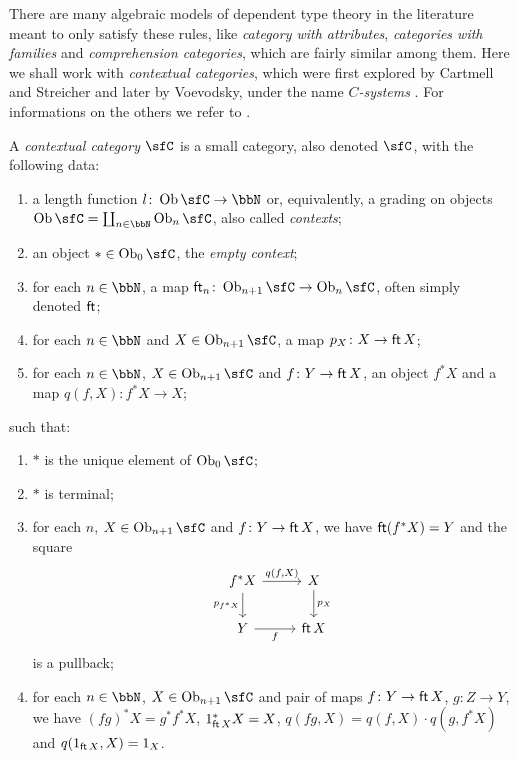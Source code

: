 \noindent
There are many algebraic models of dependent type theory in the literature meant
to only satisfy these rules, like
\emph{category with attributes}, \emph{categories with families} and
\emph{comprehension categories}, which are
fairly similar among them.
Here we shall work with \emph{contextual
categories}, which were first explored by Cartmell and Streicher
\cite{Car78,Car86,Str91} and later by Voevodsky, under the name
$C$\emph{-systems} \cite{Voe14a}. For informations on the
others we refer to \cite{nlab:categorical_model_of_dependent_types}.

\begin{defn}
  A \emph{contextual category} $\sfC$ is a small category, also denoted $\sfC$,
  with the following data:
  \begin{enumerate}
    \item a length function $l\colon\Ob\sfC\rightarrow\bbN$ or, equivalently, a
      grading on objects $\Ob\sfC=\coprod_{n\in\bbN}\Ob_n\sfC$, also called
      \emph{contexts};
    \item an object $*\in\Ob_0\sfC$, the \emph{empty context};
    \item for each $n\in\bbN$, a map
      $\cft_n\colon\Ob_{n+1}\sfC\rightarrow\Ob_n\sfC$, often simply denoted
      $\operatorname{\mathsf{ft}}$;
    \item for each $n\in\bbN$ and $X\in\Ob_{n+1}\sfC$, a map $p_X\colon
      X\rightarrow\operatorname{\mathsf{ft}} X$;
    \item for each $n\in\bbN$, $X\in\Ob_{n+1}\sfC$ and $f\colon Y\rightarrow
      \operatorname{\mathsf{ft}} X$, an object $f^*X$ and a map $q(f,X)\colon f^*X\rightarrow X$;
  \end{enumerate}
  such that:
  \begin{enumerate}
    \item $*$ is the unique element of $\Ob_0\sfC$;
    \item $*$ is terminal;
    \item for each $n$, $X\in\Ob_{n+1}\sfC$ and $f\colon Y\rightarrow \operatorname{\mathsf{ft}} X$, we
      have $\operatorname{\mathsf{ft}}(f^*X)=Y$ and the square
      \[\begin{tikzcd}
        {f^*X} & X \\
        Y & \cft X
        \arrow["f"', from=2-1, to=2-2]
        \arrow["{p_X}", from=1-2, to=2-2]
        \arrow["{q(f,X)}", from=1-1, to=1-2]
        \arrow["{p_{f^*X}}"', from=1-1, to=2-1]
      \end{tikzcd}\]
      is a pullback;
    \item for each $n\in\bbN$, $X\in\Ob_{n+1}\sfC$ and pair of maps $f\colon
      Y\rightarrow \operatorname{\mathsf{ft}} X$, $g\colon Z\rightarrow Y$, we have $(fg)^*X=g^*f^*X$,
      $1^*_{\operatorname{\mathsf{ft}} X}X=X$, $q(fg,X)=q(f,X)\cdot q(g,f^*X)$ and $q(1_{\operatorname{\mathsf{ft}} X},X)=1_X$.
  \end{enumerate}
\end{defn}

